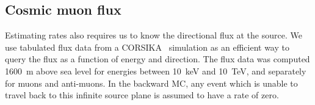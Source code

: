 \subsection{Cosmic muon flux}
Estimating rates also requires us to know the directional flux at the source. We
use tabulated flux data from a CORSIKA~\cite{corsika} simulation as an efficient
way to query the flux as a function of energy and direction. The flux data was
computed \SI{1600}{\metre} above sea level for energies between \SI{10}{\keV}
and \SI{10}{\TeV}, and separately for muons and anti-muons. In the backward MC,
any event which is unable to travel back to this infinite source plane is
assumed to have a rate of zero.



